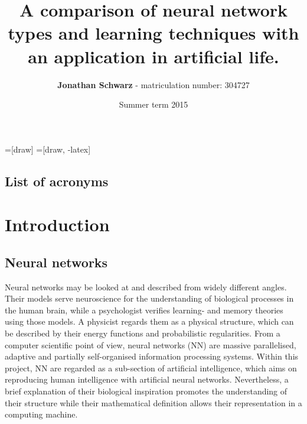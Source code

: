 \documentclass[10pt,a4paper,DIV=11]{scrreprt}
\title
{
     A comparison of neural network types and learning techniques with an application in artificial life.
}
\author
{
    \textbf{Jonathan Schwarz} - matriculation number: 304727
}
\date
{
    Summer term 2015
}
\begin{document}
=[draw]
=[draw, -latex] 


\maketitle
\thispagestyle{empty}
\newpage
{\large\tableofcontents}
\newpage

\thispagestyle{empty}

\section*{List of acronyms}
\begin{acronym}
\end{acronym}

\newpage

\chapter{Introduction}
\section{Neural networks}
Neural networks may be looked at and described from widely different angles. Their models serve neuroscience for the understanding of biological processes in the human brain, while a psychologist verifies learning- and memory theories using those models. A physicist regards them as a physical structure, which can be described by their energy functions and probabilistic regularities. From a computer scientific point of view, neural networks (NN) are massive parallelised, adaptive and partially self-organised information processing systems. \cite{NNGER}
Within this project, NN are regarded as a sub-section of artificial intelligence, which aims on reproducing human intelligence with artificial neural networks. Nevertheless, a brief explanation of their biological inspiration promotes the understanding of their structure while their mathematical definition allows their representation in a computing machine.
\end{document}
